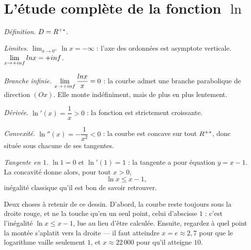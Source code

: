 \section{L'étude complète de la fonction $\ln$}

\begin{exemple}
\emph{Définition.} $D = R^{+*}$.

\emph{Limites.} $\lim_{x\to0^{+}} \ln x = -\infty$ : l'axe des ordonnées est
asymptote verticale. $\limpinf \ln x = +\infty$.

\emph{Branche infinie.} $\limpinf \dfrac{\ln x}{x} = 0$ : la courbe admet une
branche parabolique de direction $(Ox)$. Elle monte indéfiniment, mais de plus
en plus lentement.

\emph{Dérivée.} $\ln'(x) = \dfrac{1}{x} > 0$ : la fonction est strictement
croissante.

\emph{Convexité.} $\ln''(x) = -\dfrac{1}{x^{2}} < 0$ : la courbe est concave
sur tout $R^{+*}$, donc située sous chacune de ses tangentes.

\emph{Tangente en $1$.} $\ln 1 = 0$ et $\ln'(1) = 1$ : la tangente a pour
équation $y = x-1$. La concavité donne alors, pour tout $x>0$,
\[
  \ln x \leq x-1,
\]
inégalité classique qu'il est bon de savoir retrouver.
\end{exemple}

\begin{visualisation}
\begin{center}
\end{center}

Deux choses à retenir de ce dessin. D'abord, la courbe reste toujours sous la
droite rouge, et ne la touche qu'en un seul point, celui d'abscisse $1$ :
c'est l'inégalité $\ln x \leq x-1$, lue au lieu d'être calculée. Ensuite,
regardez à quel point la montée s'aplatit vers la droite — il faut atteindre
$x = e \approx 2{,}7$ pour que le logarithme vaille seulement $1$, et
$x \approx 22\,000$ pour qu'il atteigne $10$.
\end{visualisation}

